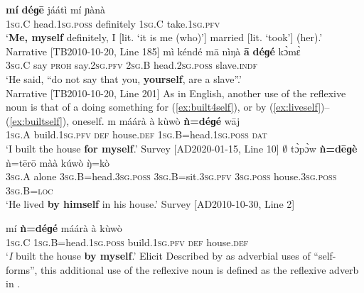 \documentclass[output=paper]{langscibook}
\begin{document}
\gll \textbf{mí} \textbf{déɡē} jáátì mí ɲànà \\
	1\textsc{sg}.C head.1\textsc{sg}.\textsc{poss} definitely 1\textsc{sg}.C take.1\textsc{sg}.\textsc{pfv} \\
	\glt  `\textbf{Me, myself} definitely, I [lit. `it is me (who)'] married [lit. `took'] (her).'\\
	Narrative [TB2010-10-20, Line 185]
	\z
\ea \label{ex:slave}
\gll mì kéndé mā nìŋà \textbf{ā} \textbf{déɡé} kɔ̀mɛ̀ \\
	3\textsc{sg}.C say \textsc{proh} say.2\textsc{sg}.\textsc{pfv} 2\textsc{sg}.B head.2\textsc{sg}.\textsc{poss} slave.\textsc{indf} \\
	\glt `He said, ``do not say that you, \textbf{yourself}, are a slave''.' \\
	 Narrative [TB2010-10-20, Line 201]
	\z
As in English, another use of the reflexive noun is that of a doing something for (\ref{ex:built4self}), or by (\ref{ex:liveself})--(\ref{ex:builtself}), oneself.
\ea \label{ex:built4self}
\gll m máárà à kùwò \textbf{ǹ=déɡé} wāj \\
1\textsc{sg}.A build.1\textsc{sg}.\textsc{pfv} \textsc{def} house.\textsc{def} 1\textsc{sg}.B=head.1\textsc{sg}.\textsc{poss} \textsc{dat} \\
\glt `I built the house \textbf{for myself}.' Survey [AD2020-01-15, Line 10]
\z 
\ea \label{ex:liveself}
\gll $\emptyset$ tɔ̀pɔ̀w \textbf{ǹ=dēɡè} ǹ=tērō màà kúwò ŋ̀=kò \\
3\textsc{sg}.A alone 3\textsc{sg}.B=head.3\textsc{sg}.\textsc{poss} 3\textsc{sg}.B=sit.3\textsc{sg}.\textsc{pfv} 3\textsc{sg}.\textsc{poss} house.3\textsc{sg}.\textsc{poss} 3\textsc{sg}.B=\textsc{loc} \\
\glt `He lived \textbf{by himself} in his house.' Survey [AD2010-10-30, Line 2]
\z
\ea \label{ex:builtself}

\gll mí \textbf{ǹ=déɡé} máárà à kùwò \\
1\textsc{sg}.C 1\textsc{sg}.B=head.1\textsc{sg}.\textsc{poss} build.1\textsc{sg}.\textsc{pfv} \textsc{def} house.\textsc{def}\\
\glt `\textit{I} built the house \textbf{by myself}.' Elicit \citep[443]{HantganHeath2018}
\z 
Described by \cite[8--9]{GastKoenig2002} as adverbial uses of ``self-forms'', this additional use of the reflexive noun is defined as the reflexive adverb in \cite[10]{Haspelmath2019}.
\end{document}

